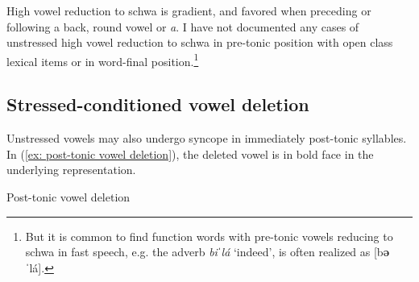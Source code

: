 High vowel reduction to schwa is gradient, and favored when preceding or following a back, round vowel or \textit{a}. I have not documented any cases of unstressed high vowel reduction to schwa in pre-tonic position with open class lexical items or in word-final position.\footnote{But it is common to find function words with pre-tonic vowels reducing to schwa in fast speech, e.g. the adverb \textit{biˈlá} ‘indeed’, is often realized as [b\textbf{ə}ˈlá].}

\subsection{Stressed-conditioned vowel deletion}
\label{subsubsec*: stress-conditioned vowel deletion}

Unstressed vowels may also undergo syncope in immediately post-tonic syllables. In (\ref{ex: post-tonic vowel deletion}), the deleted vowel is in bold face in the underlying representation.


\newpage
\ea\label{ex: post-tonic vowel deletion}
{Post-tonic vowel deletion}

